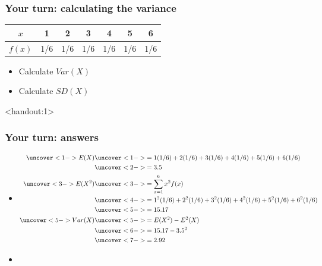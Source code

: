 \documentclass[handout]{beamer}\usepackage{graphicx, color}
\newcommand{\answers}{1}
\numberwithin{equation}{section}
\begin{document}
\begin{frame}
\frametitle{Your turn: calculating the variance}

\begin{tabular}{ccccccc}
$x$ & 1 & 2 & 3 & 4 & 5 & 6 \\ \hline
$f(x)$ & 1/6  & 1/6  & 1/6  & 1/6  & 1/6  & 1/6  \\
\end{tabular}

\begin{itemize}
\item Calculate $Var(X)$
\item Calculate $SD(X)$
\end{itemize}
\end{frame}


\begin{frame}<handout:\answers>
\frametitle{Your turn: answers} \scriptsize

\begin{itemize}
\item
\begin{align*}
\uncover<1->{E(X)} &\uncover<1->{= 1 (1/6) + 2(1/6) + 3(1/6) + 4(1/6) + 5(1/6) + 6 (1/6)} \\
&\uncover<2->{ = 3.5} \\
\uncover<3->{E(X^2)} & \uncover<3->{= \sum_{x = 1}^6 x^2 f(x)} \\
&\uncover<4->{ = 1^2 (1/6) + 2^2(1/6) + 3^2(1/6) + 4^2(1/6) + 5^2(1/6) + 6 ^2(1/6)}  \\
& \uncover<5->{=  15.17} \\
\uncover<5->{Var(X)} &\uncover<5->{ = E(X^2) - E^2(X)} \\
& \uncover<6->{= 15.17 - 3.5^2} \\
&\uncover<7->{ = 2.92}
\end{align*}
\item {}
\end{itemize}
\end{frame}
\end{document}
